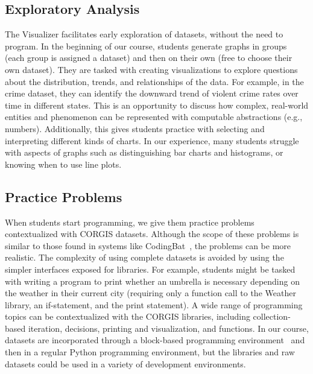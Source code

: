 \documentclass{sig-alternate}
\begin{document}



\subsection{Exploratory Analysis}

The Visualizer facilitates early exploration of datasets, without the need to program.
In the beginning of our course, students generate graphs in groups (each group is assigned a dataset) and then on their own (free to choose their own dataset).
They are tasked with creating visualizations to explore questions about the distribution, trends, and relationships of the data.
For example, in the crime dataset, they can identify the downward trend of violent crime rates over time in different states.
This is an opportunity to discuss how complex, real-world entities and phenomenon can be represented with computable abstractions (e.g., numbers).
Additionally, this gives students practice with selecting and interpreting different kinds of charts. 
In our experience, many students struggle with aspects of graphs such as distinguishing bar charts and histograms, or knowing when to use line plots.

\subsection{Practice Problems}

When students start programming, we give them practice problems contextualized with CORGIS datasets.
Although the scope of these problems is similar to those found in systems like CodingBat~\cite{parlante2015codingbat}, the problems can be more realistic.
The complexity of using complete datasets is avoided by using the simpler interfaces exposed for libraries.
For example, students might be tasked with writing a program to print whether an umbrella is necessary depending on the weather in their current city (requiring only a function call to the Weather library, an if-statement, and the print statement).
A wide range of programming topics can be contextualized with the CORGIS libraries, including collection-based iteration, decisions, printing and visualization, and functions.
In our course, datasets are incorporated through a block-based programming environment~\cite{bart-blockpy} and then in a regular Python programming environment, but the libraries and raw datasets could be used in a variety of development environments.
\end{document}

